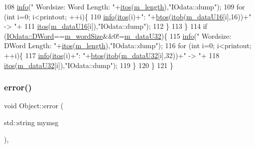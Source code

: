 \begin{DoxyCode}
108     \hyperlink{classObject_a644fd329ea4cb85f54fa6846484b84a8}{info}(\textcolor{stringliteral}{" Wordsize: Word  Length: "}+\hyperlink{Tools_8h_af330027dbdafb9a30768b3613c553e60}{itos}(\hyperlink{classIOdata_afabe57441da019eb614d277799106aac}{m\_length}),\textcolor{stringliteral}{"IOdata::dump"});
109     \textcolor{keywordflow}{for} (\textcolor{keywordtype}{int} i=0; i<printout; ++i)\{
110       \hyperlink{classObject_a644fd329ea4cb85f54fa6846484b84a8}{info}(\hyperlink{Tools_8h_af330027dbdafb9a30768b3613c553e60}{itos}(i)+\textcolor{stringliteral}{": "}+\hyperlink{Tools_8h_adc37030be213033de444249d1eabcb5f}{btos}(\hyperlink{Tools_8h_a3697e4f3058ec4db63300f2eb247f24b}{itob}(\hyperlink{classIOdata_a8d698e077b7898009691b9086a3e6453}{m\_dataU16}[i],16))+\textcolor{stringliteral}{" -> "}+
111           \hyperlink{Tools_8h_af330027dbdafb9a30768b3613c553e60}{itos}(\hyperlink{classIOdata_a8d698e077b7898009691b9086a3e6453}{m\_dataU16}[i]),\textcolor{stringliteral}{"IOdata::dump"});
112     \}
113   \}
114   \textcolor{keywordflow}{if} (\hyperlink{classIOdata_a37c53ebf4bf8d866aac8af572962a84ca458da82d97e3ea9715c34b558c34f734}{IOdata::DWord}==\hyperlink{classIOdata_a719b0ce607ada4fa91b12d6ecfa1b4c9}{m\_wordSize}&&0!=\hyperlink{classIOdata_a247cdaefd87084e3cad1d530d592d99a}{m\_dataU32})\{
115     \hyperlink{classObject_a644fd329ea4cb85f54fa6846484b84a8}{info}(\textcolor{stringliteral}{" Wordsize: DWord Length: "}+\hyperlink{Tools_8h_af330027dbdafb9a30768b3613c553e60}{itos}(\hyperlink{classIOdata_afabe57441da019eb614d277799106aac}{m\_length}),\textcolor{stringliteral}{"IOdata::dump"});
116     \textcolor{keywordflow}{for} (\textcolor{keywordtype}{int} i=0; i<printout; ++i)\{
117       \hyperlink{classObject_a644fd329ea4cb85f54fa6846484b84a8}{info}(\hyperlink{Tools_8h_af330027dbdafb9a30768b3613c553e60}{itos}(i)+\textcolor{stringliteral}{": "}+\hyperlink{Tools_8h_adc37030be213033de444249d1eabcb5f}{btos}(\hyperlink{Tools_8h_a3697e4f3058ec4db63300f2eb247f24b}{itob}(\hyperlink{classIOdata_a247cdaefd87084e3cad1d530d592d99a}{m\_dataU32}[i],32))+\textcolor{stringliteral}{" -> "}+
118           \hyperlink{Tools_8h_af330027dbdafb9a30768b3613c553e60}{itos}(\hyperlink{classIOdata_a247cdaefd87084e3cad1d530d592d99a}{m\_dataU32}[i]),\textcolor{stringliteral}{"IOdata::dump"});
119     \}
120   \}
121 \}
\end{DoxyCode}
\mbox{\label{classObject_a204a95f57818c0f811933917a30eff45}} 
\subsubsection{\texorpdfstring{error()}{error()}\hspace{0.1cm}{\footnotesize\ttfamily [1/2]}}
{\footnotesize\ttfamily void Object\+::error (\begin{DoxyParamCaption}\item[{std\+::string}]{mymsg }\end{DoxyParamCaption})\hspace{0.3cm}{\ttfamily [inline]}, {\ttfamily [inherited]}}



